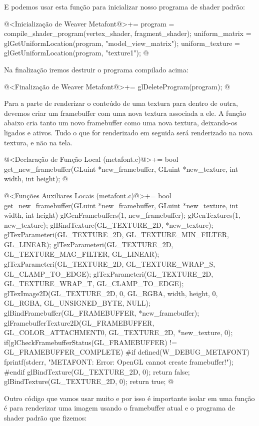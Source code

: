 {E podemos usar esta função para inicializar nosso programa de shader padrão:

\iniciocodigo
@<Inicialização de Weaver Metafont@>+=
{
  program = compile_shader_program(vertex_shader, fragment_shader);
  uniform_matrix = glGetUniformLocation(program, "model_view_matrix");
  uniform_texture = glGetUniformLocation(program, "texture1");
}
@
\fimcodigo

Na finalização iremos destruir o programa compilado acima:

\iniciocodigo
@<Finalização de Weaver Metafont@>+=
glDeleteProgram(program);
@
\fimcodigo

Para a parte de renderizar o conteúdo de uma textura para dentro de
outra, devemos criar um framebuffer com uma nova textura associada a
ele. A função abaixo cria tanto um novo framebuffer como uma nova
textura, deixando-os ligados e ativos. Tudo o que for renderizado em
seguida será renderizado na nova textura, e não na tela.

\iniciocodigo
@<Declaração de Função Local (metafont.c)@>+=
bool get_new_framebuffer(GLuint *new_framebuffer, GLuint *new_texture,
                         int width, int height);
@
\fimcodigo

\iniciocodigo
@<Funções Auxiliares Locais (metafont.c)@>+=
bool get_new_framebuffer(GLuint *new_framebuffer, GLuint *new_texture,
                         int width, int height){
  glGenFramebuffers(1, new_framebuffer);
  glGenTextures(1, new_texture);
  glBindTexture(GL_TEXTURE_2D, *new_texture);
  glTexParameteri(GL_TEXTURE_2D, GL_TEXTURE_MIN_FILTER, GL_LINEAR);
  glTexParameteri(GL_TEXTURE_2D, GL_TEXTURE_MAG_FILTER, GL_LINEAR);
  glTexParameteri(GL_TEXTURE_2D, GL_TEXTURE_WRAP_S, GL_CLAMP_TO_EDGE);
  glTexParameteri(GL_TEXTURE_2D, GL_TEXTURE_WRAP_T, GL_CLAMP_TO_EDGE);
  glTexImage2D(GL_TEXTURE_2D, 0, GL_RGBA, width, height, 0, GL_RGBA,
               GL_UNSIGNED_BYTE, NULL);
  glBindFramebuffer(GL_FRAMEBUFFER, *new_framebuffer);
  glFramebufferTexture2D(GL_FRAMEBUFFER, GL_COLOR_ATTACHMENT0, GL_TEXTURE_2D,
                         *new_texture, 0);
  if(glCheckFramebufferStatus(GL_FRAMEBUFFER) != GL_FRAMEBUFFER_COMPLETE){
#if defined(W_DEBUG_METAFONT)
    fprintf(stderr, "METAFONT: Error: OpenGL cannot create framebuffer!\n");
#endif
    glBindTexture(GL_TEXTURE_2D, 0);
    return false;
  }
  glBindTexture(GL_TEXTURE_2D, 0);
  return true;
}
@
\fimcodigo

Outro código que vamos usar muito e por isso é importante isolar em
uma função é para renderizar uma imagem usando o framebuffer atual e o
programa de shader padrão que fizemos:

}
